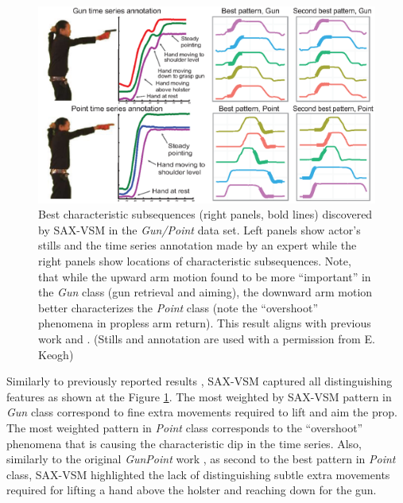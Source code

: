 \begin{figure}[t]
   \centering
   \includegraphics[width=130mm]{figures/gun-point.eps}
   \caption{Best characteristic subsequences (right panels, bold lines) discovered by SAX-VSM in
   the \textit{Gun/Point} data set. 
   Left panels show actor's stills and the time series annotation made by an expert while the right panels 
   show locations of characteristic subsequences.
   Note, that while the upward arm motion found to be more ``important'' in the \textit{Gun} class 
   (gun retrieval and aiming), the downward arm motion better characterizes the \textit{Point} class 
   (note the ``overshoot'' phenomena in propless arm return). 
   This result aligns with previous work \cite{citeulike:7344347} and \cite{citeulike:11345338}.
   (Stills and annotation are used with a permission from E. Keogh) }
   \label{fig:shapelet-like-patterns}
\end{figure}

Similarly to previously reported results \cite{citeulike:7344347} \cite{citeulike:11345338}, 
SAX-VSM captured all distinguishing features as shown at the Figure \ref{fig:shapelet-like-patterns}. 
The most weighted by SAX-VSM pattern in \textit{Gun} class correspond to fine extra movements required to 
lift and aim the prop. 
The most weighted pattern in \textit{Point} class corresponds to the ``overshoot'' phenomena that is causing the 
characteristic dip in the time series. 
Also, similarly to the original \textit{GunPoint} work \cite{Ratanamahatana04makingtime-series}, as second to the best 
pattern in \textit{Point} class, SAX-VSM highlighted the lack of distinguishing subtle extra movements required
for lifting a hand above the holster and reaching down for the gun.

